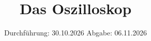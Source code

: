 


\subject{v300}
\title{Das Oszilloskop}
\date{%
  Durchführung: 30.10.2026
  \hspace{3em}
  Abgabe: 06.11.2026
}



\maketitle
\thispagestyle{empty}
\tableofcontents
\newpage






\printbibliography{}




